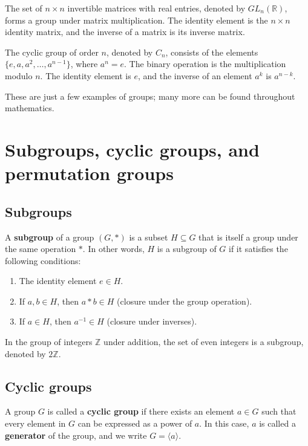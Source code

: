\begin{example}
  The set of $n \times n$ invertible matrices with real entries, denoted by $GL_n(\mathbb{R})$, forms a group under matrix multiplication. The identity element is the $n \times n$ identity matrix, and the inverse of a matrix is its inverse matrix.
\end{example}

\begin{example}
  The cyclic group of order $n$, denoted by $C_n$, consists of the elements $\{e, a, a^2, \dots, a^{n-1}\}$, where $a^n = e$. The binary operation is the multiplication modulo $n$. The identity element is $e$, and the inverse of an element $a^k$ is $a^{n-k}$.
\end{example}

These are just a few examples of groups; many more can be found throughout mathematics.


\section{Subgroups, cyclic groups, and permutation groups}

\subsection{Subgroups}
\begin{definition}

  A \textbf{subgroup} of a group $(G, *)$ is a subset $H \subseteq G$ that is itself a group under the same operation $*$. In other words, $H$ is a subgroup of $G$ if it satisfies the following conditions:

  \begin{enumerate}
    \item The identity element $e \in H$.
    \item If $a, b \in H$, then $a * b \in H$ (closure under the group operation).
    \item If $a \in H$, then $a^{-1} \in H$ (closure under inverses).
  \end{enumerate}
\end{definition}

\begin{example}
  In the group of integers $\mathbb{Z}$ under addition, the set of even integers is a subgroup, denoted by $2\mathbb{Z}$.
\end{example}

\subsection{Cyclic groups}
\begin{definition}

  A group $G$ is called a \textbf{cyclic group} if there exists an element $a \in G$ such that every element in $G$ can be expressed as a power of $a$. In this case, $a$ is called a \textbf{generator} of the group, and we write $G = \langle a \rangle$.

\end{definition}

